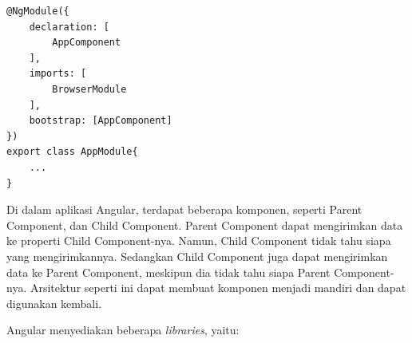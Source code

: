 \begin{itemize}
\begin{lstlisting}[label={lst:moduleComponent}, caption=Module dengan Komponen]
@NgModule({
	declaration: [
		AppComponent
	],
	imports: [
		BrowserModule	
	],
	bootstrap: [AppComponent]
})
export class AppModule{
	...
}
\end{lstlisting} 
\end{itemize}

Di dalam aplikasi Angular, terdapat beberapa komponen, seperti Parent Component, dan Child Component. Parent Component dapat mengirimkan data ke properti Child Component-nya. Namun, Child Component tidak tahu siapa yang mengirimkannya. Sedangkan Child Component juga dapat mengirimkan data ke Parent Component, meskipun dia tidak tahu siapa Parent Component-nya. Arsitektur seperti ini dapat membuat komponen menjadi mandiri dan dapat digunakan kembali.

Angular menyediakan beberapa \textit{libraries}, yaitu:

